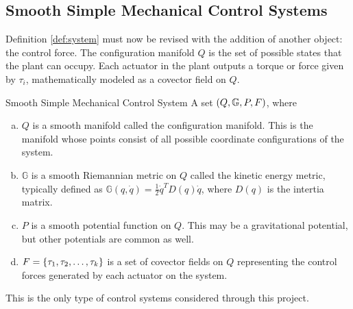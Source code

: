 \documentclass[main.tex]{subfiles}
\begin{document}
\subsection{Smooth Simple Mechanical Control Systems}
Definition \ref{def:system} must now be revised with the addition of another object: the control force. 
The configuration manifold $Q$ is the set of possible states that the plant can occupy.
Each actuator in the plant outputs a torque or force given by $\tau_i$, mathematically modeled as a covector field on $Q$. 
\begin{boxdef}{Smooth Simple Mechanical Control System \cite{bullo2019geometric}}
A set $\del{Q,\mathbb{G},P,F}$, where
\begin{enumerate}[(a)]
    \item $Q$ is a smooth manifold called the configuration manifold. This is the manifold whose points consist of all possible coordinate configurations of the system.
    \item $\mathbb{G}$ is a smooth Riemannian metric on $Q$ called the kinetic energy metric, typically defined as $\mathbb{G}(q,\dot q)=\frac{1}{2}\dot q^T D(q) \dot q$, where $D(q)$ is the intertia matrix.
    \item $P$ is a smooth potential function on $Q$. This may be a gravitational potential, but other potentials are common as well.
    \item $F=\cbr{\tau_1,\tau_2,\ldots,\tau_k}$ is a set of covector fields on $Q$ representing the control forces generated by each actuator on the system.
\end{enumerate}
\end{boxdef}\label{def:controlsystem}
This is the only type of control systems considered through this project.

\end{document}

